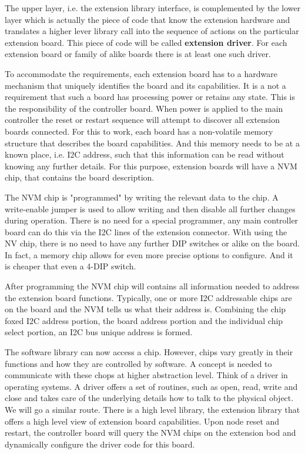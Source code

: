 The upper layer, i.e. the extension library interface, is complemented by the lower layer which is actually the piece of code that know the extension hardware and translates a higher lever library call into the sequence of actions on the particular extension board. This piece of code will be called \textbf{extension driver}. For each extension board or family of alike boards there is at least one such driver.


To accommodate the requirements, each extension board has to a hardware mechanism that uniquely identifies the board and its capabilities. It is a not a requirement that such a board has processing power or retains any state. This is the responsibility of the controller board. When power is applied to the main controller the reset or restart sequence will attempt to discover all extension boards connected. For this to work, each board has a non-volatile memory structure that describes the board capabilities. And this memory needs to be at a known place, i.e. I2C address, such that this information can be read without knowing any further details. For this purpose, extension boards will have a NVM chip, that contains the board description.

The NVM chip is "programmed" by writing the relevant data to the chip. A write-enable jumper is used to allow writing and then disable all further changes during operation. There is no need for a special programmer, any main controller board can do this via the I2C lines of the extension connector. With using the NV chip, there is no need to have any further DIP switches or alike on the board. In fact, a memory chip allows for even more precise options to configure. And it is cheaper that even a 4-DIP switch.

After programming the NVM chip will contains all information needed to address the extension board functions. Typically, one or more I2C addressable chips are on the board and the NVM tells us what their address is. Combining the chip foxed I2C address portion, the board address portion and the individual chip select portion, an I2C bus unique address is formed. 

The software library can now access a chip. However, chips vary greatly in their functions and how they are controlled by software. A concept is needed to communicate with these chops at  higher abstraction level. Think of a driver in operating systems. A driver offers a set of routines, such as open, read, write and close and takes care of the underlying details how to talk to the physical object. We will go a similar route. There is a high level library, the extension library that offers a high level view of extension board capabilities. Upon node reset and restart, the controller board will query the NVM chips on the extension bod and dynamically configure the driver code for this board.


